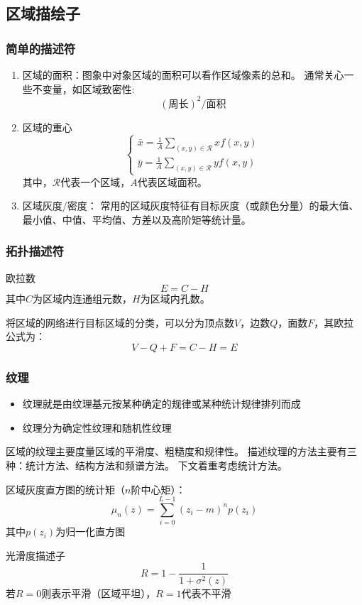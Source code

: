 \subsection{区域描绘子}
\subsubsection{简单的描述符}
\begin{enumerate}
\item 区域的面积：图象中对象区域的面积可以看作区域像素的总和。
通常关心一些不变量，如区域致密性:
\[(\text{周长})^2/\text{面积}\]

\item 区域的重心
\[\begin{cases}
\bar{x}=\frac{1}{A}\sum_{(x,y)\in\mathcal{R}}xf(x,y)\\
\bar{y}=\frac{1}{A}\sum_{(x,y)\in\mathcal{R}}yf(x,y)
\end{cases}\]
其中，$\mathcal{R}$代表一个区域，$A$代表区域面积。

\item 区域灰度/密度：
常用的区域灰度特征有目标灰度（或颜色分量）的最大值、最小值、中值、平均值、方差以及高阶矩等统计量。
\end{enumerate}

\subsubsection{拓扑描述符}
欧拉数
\[E=C-H\]
其中$C$为区域内连通组元数，$H$为区域内孔数。

将区域的网络进行目标区域的分类，可以分为顶点数$V$，边数$Q$，面数$F$，其欧拉公式为：
\[V-Q+F=C-H=E\]


\subsubsection{纹理}
\begin{itemize}
	\item 纹理就是由纹理基元按某种确定的规律或某种统计规律排列而成
	\item 纹理分为确定性纹理和随机性纹理
\end{itemize}

区域的纹理主要度量区域的平滑度、粗糙度和规律性。
描述纹理的方法主要有三种：统计方法、结构方法和频谱方法。
下文着重考虑统计方法。

区域灰度直方图的统计矩（$n$阶中心矩）：
\[\mu_n(z)=\sum_{i=0}^{L-1}(z_i-m)^np(z_i)\]
其中$p(z_i)$为归一化直方图

光滑度描述子
\[R=1-\frac{1}{1+\sigma^2(z)}\]
若$R=0$则表示平滑（区域平坦），$R=1$代表不平滑

